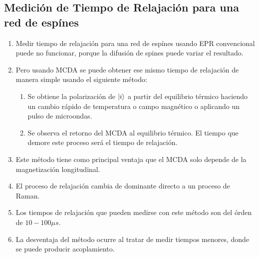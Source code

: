 \documentclass[aps,rmp,reprint,longbibliography]{revtex4-1}
\begin{document}
\subsection{Medición de Tiempo de Relajación para una red de espínes}
\begin{enumerate}
\item Medir tiempo de relajación para una red de espínes usando EPR convencional puede no funcionar, porque la difusión de spines puede variar el resultado.
\item Pero usando MCDA se puede obtener ese mismo tiempo de relajación de manera simple usando el siguiente método:
\begin{enumerate}
    \item Se obtiene la polarización de $\ket{i}$ a partir del equilibrio térmico haciendo un cambio rápido de temperatura o campo magnético o aplicando un pulso de microondas.
    \item Se observa el retorno del MCDA al equilibrio térmico. El tiempo que demore este proceso será el tiempo de relajación.
\end{enumerate}
\item Este método tiene como principal ventaja que el MCDA solo depende de la magnetización longitudinal. 
\item El proceso de relajación cambia de dominante directo a un proceso de Raman.
\item Los tiempos de relajación que pueden medirse con este método son del órden de $10-100\mu s$. 
\item La desventaja del método ocurre al tratar de medir tiempos menores, donde se puede producir acoplamiento.
\end{enumerate}
\end{document}
